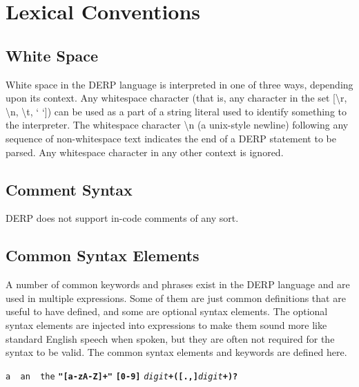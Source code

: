 \section{Lexical Conventions}

\subsection{White Space}
White space in the DERP language is interpreted in one of three ways,
depending upon its context. Any whitespace character (that is, any
character in the set [\textbackslash r, \textbackslash n, \textbackslash t, ‘ ‘]) can be used as a part of a
string literal used to identify something to the interpreter.
The whitespace character \textbackslash n (a unix-style newline) following any sequence
of non-whitespace text indicates the end of a DERP statement to be parsed.
Any whitespace character in any other context is ignored.


\subsection{Comment Syntax}
DERP does not support in-code comments of any sort.

\subsection{Common Syntax Elements}
A number of common keywords and phrases exist in the DERP language and are
used in multiple expressions. Some of them are just common definitions that
are useful to have defined, and some are optional syntax elements.
The optional syntax elements are injected into expressions to make them
sound more like standard English speech when spoken, but they are often not
required for the syntax to be valid. The common syntax elements and keywords
are defined here.

\begin{description}[labelindent=1cm,leftmargin=\onelen,labelwidth=1cm]
     \texttt{a \textbf{\textbar} an \textbf{\textbar} the}
     \texttt{\textbf{"[a-zA-Z]+"}}
     \texttt{\textbf{[0-9]}}
     \texttt{\textit{digit}\textbf{+([.,]}\textit{digit}\textbf{+)?}}
\end{description}
